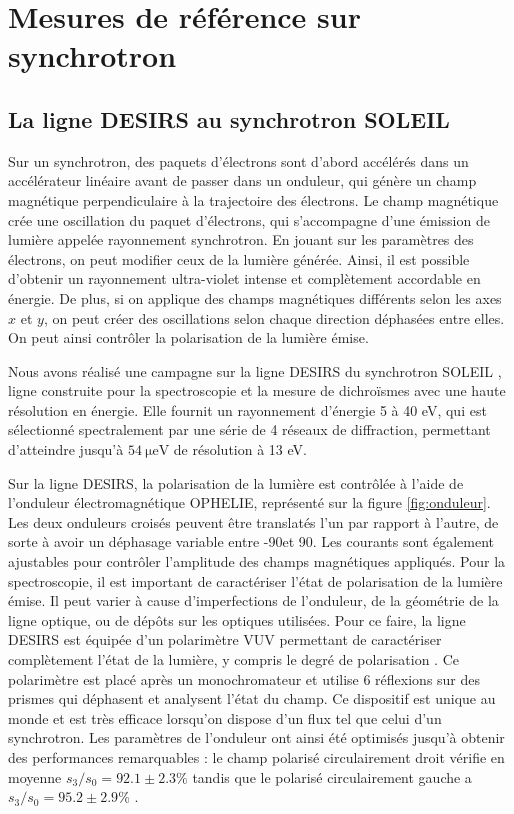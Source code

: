 \section{Mesures de référence sur synchrotron}
\subsection{La ligne DESIRS au synchrotron SOLEIL}
Sur un synchrotron, des paquets d'électrons sont d'abord accélérés dans un accélérateur linéaire avant de passer dans un onduleur, qui génère un champ magnétique perpendiculaire à la trajectoire des électrons. Le champ magnétique crée une oscillation du paquet d'électrons, qui s'accompagne d'une émission de lumière appelée rayonnement synchrotron. En jouant sur les paramètres des électrons, on peut modifier ceux de la lumière générée. Ainsi, il est possible d'obtenir un rayonnement ultra-violet intense et complètement accordable en énergie. De plus, si on applique des champs magnétiques différents selon les axes $x$ et $y$, on peut créer des oscillations selon chaque direction déphasées entre elles. On peut ainsi contrôler la polarisation de la lumière émise.

Nous avons réalisé une campagne sur la ligne DESIRS du synchrotron SOLEIL , ligne construite pour la spectroscopie et la mesure de dichroïsmes avec une haute résolution en énergie. Elle fournit un rayonnement d'énergie 5 à 40 eV, qui est sélectionné spectralement par une série de 4 réseaux de diffraction, permettant d'atteindre jusqu'à $\SI{54}{\micro\eV}$ de résolution à 13 eV.

Sur la ligne DESIRS, la polarisation de la lumière est contrôlée à l'aide de l'onduleur électromagnétique OPHELIE, représenté sur la figure \ref{fig:onduleur}. Les deux onduleurs croisés peuvent être translatés l'un par rapport à l'autre, de sorte à avoir un déphasage variable entre -90\degres et 90\degres. Les courants sont également ajustables pour contrôler l'amplitude des champs magnétiques appliqués. Pour la spectroscopie, il est important de caractériser l'état de polarisation de la lumière émise. Il peut varier à cause d'imperfections de l'onduleur, de la géométrie de la ligne optique, ou de dépôts sur les optiques utilisées. Pour ce faire, la ligne DESIRS est équipée d'un polarimètre VUV permettant de caractériser complètement l'état de la lumière, y compris le degré de polarisation . Ce polarimètre est placé après un monochromateur et utilise 6 réflexions sur des prismes qui déphasent et analysent l'état du champ. Ce dispositif est unique au monde et est très efficace lorsqu'on dispose d'un flux tel que celui d'un synchrotron. Les paramètres de l'onduleur ont ainsi été optimisés jusqu'à obtenir des performances remarquables : le champ polarisé circulairement droit vérifie en moyenne $s_3/s_0=92.1\pm2.3$\% tandis que le polarisé circulairement gauche a $s_3/s_0=95.2\pm2.9$\% .

